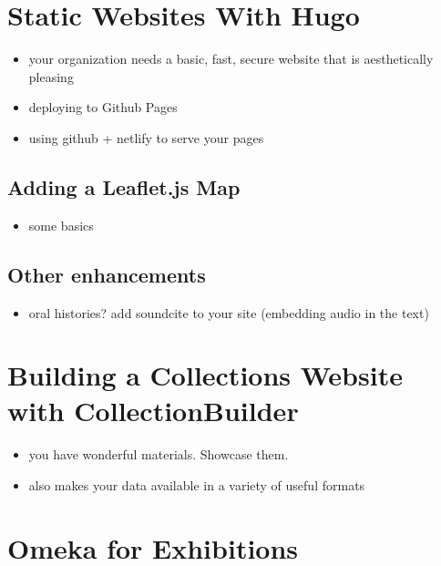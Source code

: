 \documentclass[
]{book}
\providecommand{\tightlist}{%
  \setlength{\itemsep}{0pt}\setlength{\parskip}{0pt}}
\begin{document}
\hypertarget{hugo}{%
\section{Static Websites With Hugo}\label{hugo}}

\begin{itemize}
\item
  your organization needs a basic, fast, secure website that is aesthetically pleasing
\item
  deploying to Github Pages
\item
  using github + netlify to serve your pages
\end{itemize}

\hypertarget{adding-a-leaflet.js-map}{%
\subsection{Adding a Leaflet.js Map}\label{adding-a-leaflet.js-map}}

\begin{itemize}
\tightlist
\item
  some basics
\end{itemize}

\hypertarget{other-enhancements}{%
\subsection{Other enhancements}\label{other-enhancements}}

\begin{itemize}
\tightlist
\item
  oral histories? add soundcite to your site (embedding audio in the text)
\end{itemize}

\hypertarget{collectionbuilder}{%
\section{Building a Collections Website with CollectionBuilder}\label{collectionbuilder}}

\begin{itemize}
\tightlist
\item
  you have wonderful materials. Showcase them.
\item
  also makes your data available in a variety of useful formats
\end{itemize}

\hypertarget{omeka}{%
\section{Omeka for Exhibitions}\label{omeka}}
\end{document}
